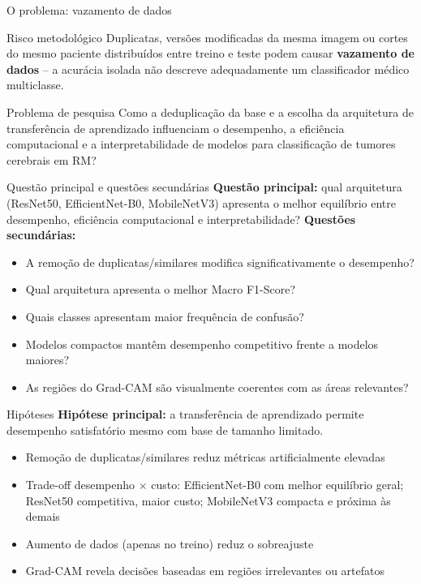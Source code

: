 \documentclass[aspectratio=169]{beamer}
\begin{document}
\begin{frame}{O problema: vazamento de dados}
  \begin{alertblock}{Risco metodológico}
    Duplicatas, versões modificadas da mesma imagem ou cortes do mesmo paciente distribuídos entre treino e teste podem causar \textbf{vazamento de dados} -- a acurácia isolada não descreve adequadamente um classificador médico multiclasse.
  \end{alertblock}
  \begin{block}{Problema de pesquisa}
    Como a deduplicação da base e a escolha da arquitetura de transferência de aprendizado influenciam o desempenho, a eficiência computacional e a interpretabilidade de modelos para classificação de tumores cerebrais em RM?
  \end{block}
\end{frame}

\begin{frame}{Questão principal e questões secundárias}
  \textbf{Questão principal:} qual arquitetura (ResNet50, EfficientNet-B0, MobileNetV3) apresenta o melhor equilíbrio entre desempenho, eficiência computacional e interpretabilidade?
  \vspace{6pt}
  \textbf{Questões secundárias:}
  \begin{itemize}
    \item A remoção de duplicatas/similares modifica significativamente o desempenho?
    \item Qual arquitetura apresenta o melhor Macro F1-Score?
    \item Quais classes apresentam maior frequência de confusão?
    \item Modelos compactos mantêm desempenho competitivo frente a modelos maiores?
    \item As regiões do Grad-CAM são visualmente coerentes com as áreas relevantes?
  \end{itemize}
\end{frame}

\begin{frame}{Hipóteses}
  \textbf{Hipótese principal:} a transferência de aprendizado permite desempenho satisfatório mesmo com base de tamanho limitado.
  \begin{itemize}
    \item[\textbf{H1}] Remoção de duplicatas/similares reduz métricas artificialmente elevadas
    \item[\textbf{H2}] Trade-off desempenho \(\times\) custo: EfficientNet-B0 com melhor equilíbrio geral; ResNet50 competitiva, maior custo; MobileNetV3 compacta e próxima às demais
    \item[\textbf{H3}] Aumento de dados (apenas no treino) reduz o sobreajuste
    \item[\textbf{H4}] Grad-CAM revela decisões baseadas em regiões irrelevantes ou artefatos
  \end{itemize}
\end{frame}
\end{document}

